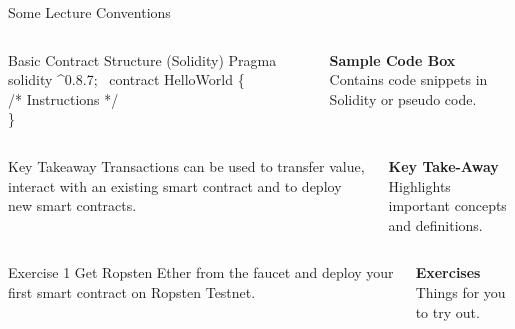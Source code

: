 \documentclass[]{beamer}
\begin{document}
\begin{frame}{Some Lecture Conventions}

	\begin{columns}[T]
		\begin{column}{0.45\textwidth}
			\vspace{-1em}
			\begin{samplecode}{Basic Contract Structure (Solidity)}
				Pragma solidity  \textasciicircum 0.8.7; \
				contract HelloWorld \{ \\
				\color{softanthracite} /* Instructions */ \\
				\color{black} \}
			\end{samplecode}			
		\end{column} %

		\begin{column}{0.5\textwidth}
			\textbf{Sample Code Box}\\
			Contains code snippets in Solidity or pseudo code.
		\end{column}
	\end{columns}

\vspace{2.5em}

	\begin{columns}[T]
		\begin{column}{0.45\textwidth}
			\vspace{-0.8em}
			\begin{keytakeaway}{Key Takeaway}
				Transactions can be used to transfer value, interact with an existing smart contract and to deploy new smart contracts.
			\end{keytakeaway}			
		\end{column}
		
		\begin{column}{0.5\textwidth}
			\textbf{Key Take-Away}\\
			Highlights important concepts and definitions.
		\end{column}
	\end{columns}

\vspace{2.5em}

	\begin{columns}[T]
		\begin{column}{0.45\textwidth}
			\vspace{-0.9em}
			\begin{exercise}{Exercise 1}
				Get Ropsten Ether from the faucet and deploy your first smart contract on Ropsten Testnet.
			\end{exercise}					
		\end{column}
		\begin{column}{0.5\textwidth}
		\textbf{Exercises}\\
			Things for you to try out.
		\end{column}
	\end{columns}

\end{frame}
\end{document}
